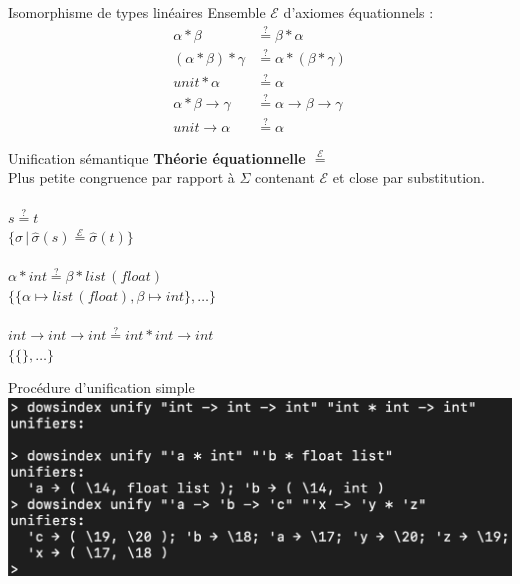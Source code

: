 \documentclass[serif]{beamer}
\newcommand{\?}{\stackrel{?}{=}}
\begin{document}
\begin{frame}{Isomorphisme de types linéaires}
  \large
  Ensemble $\mathscr E$ d'axiomes équationnels :
  \begin{align*}
    \alpha * \beta &\? \beta * \alpha \tag {Com-2} \\
    (\alpha * \beta) * \gamma &\? \alpha * (\beta * \gamma) \tag {Ass-2} \\
    unit * \alpha &\? \alpha \tag {Ass-0} \\
    \alpha * \beta \rightarrow \gamma &\? \alpha \rightarrow \beta \rightarrow \gamma \tag {Cur-2} \\
    unit \rightarrow \alpha &\? \alpha \tag {Cur-0}
  \end{align*}
\end{frame}


\begin{frame}{Unification sémantique}
  \textbf {Théorie équationnelle $\stackrel{\mathscr E}{=}$} \\
  Plus petite congruence par rapport à $\Sigma$ contenant $\mathscr E$ et close par substitution.
  ~\\~\\
  \centering
  $s \? t$ \\
  $\{ \sigma \,|\, \hat \sigma (s) \stackrel{\mathscr E}{=} \hat \sigma (t) \}$ \\
  ~\\
  $\alpha * int \? \beta * list\,(float)$ \\
  $\{ \{\alpha \mapsto list\,(float), \beta \mapsto int\}, \dots \}$ \\
  ~\\
  $int \rightarrow int \rightarrow int \? int * int \rightarrow int$ \\
  $\{\{\}, \dots \}$
\end{frame}


\begin{frame}{Procédure d'unification simple}
  \includegraphics[scale=0.3,center]{images/unify.png}
\end{frame}
\end{document}
